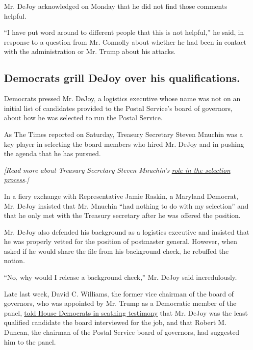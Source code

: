 Mr. DeJoy acknowledged on Monday that he did not find those comments
helpful.

``I have put word around to different people that this is not helpful,''
he said, in response to a question from Mr. Connolly about whether he
had been in contact with the administration or Mr. Trump about his
attacks.

\hypertarget{democrats-grill-dejoy-over-his-qualifications}{%
\subsection{Democrats grill DeJoy over his
qualifications.}\label{democrats-grill-dejoy-over-his-qualifications}}

Democrats pressed Mr. DeJoy, a logistics executive whose name was not on
an initial list of candidates provided to the Postal Service's board of
governors, about how he was selected to run the Postal Service.

As The Times reported on Saturday, Treasury Secretary Steven Mnuchin was
a key player in selecting the board members who hired Mr. DeJoy and in
pushing the agenda that he has pursued.

\emph{{[}Read more about Treasury Secretary Steven Mnuchin's}
\href{https://www.nytimes3xbfgragh.onion/2020/08/22/business/economy/dejoy-postmaster-general-trump-mnuchin.html}{\emph{role
in the selection process}}\emph{.{]}}

In a fiery exchange with Representative Jamie Raskin, a Maryland
Democrat, Mr. DeJoy insisted that Mr. Mnuchin ``had nothing to do with
my selection'' and that he only met with the Treasury secretary after he
was offered the position.

Mr. DeJoy also defended his background as a logistics executive and
insisted that he was properly vetted for the position of postmaster
general. However, when asked if he would share the file from his
background check, he rebuffed the notion.

``No, why would I release a background check,'' Mr. DeJoy said
incredulously.

Late last week, David C. Williams, the former vice chairman of the board
of governors, who was appointed by Mr. Trump as a Democratic member of
the panel,
\href{https://www.nytimes3xbfgragh.onion/2020/08/20/us/politics/former-postal-governor-tells-congress-mnuchin-politicized-postal-service.html}{told
House Democrats in scathing testimony} that Mr. DeJoy was the least
qualified candidate the board interviewed for the job, and that Robert
M. Duncan, the chairman of the Postal Service board of governors, had
suggested him to the panel.

